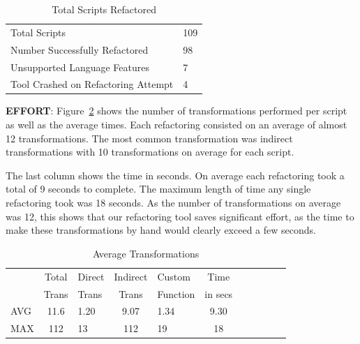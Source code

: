 \documentclass{sigplanconf}
\begin{document}
\begin{table}[htdp]
\begin{center}
\begin{tabular}{ll}
Total Scripts & 109 \\
Number Successfully Refactored & 98 \\
Unsupported Language Features & 7 \\
Tool Crashed on Refactoring Attempt & 4\\
\end{tabular}
\nocaptionrule
\caption{Total Scripts Refactored}
\label{table:totalScripts}
\end{center}
\end{table}%

\textbf{EFFORT}:  
Figure~\ref{table:avgTrans} shows the number of transformations performed per script as well as the average times.
Each refactoring consisted on an average of almost 12 transformations.  The most common transformation was indirect transformations with 10  transformations on average for each script.

The last column shows the time in seconds.  On average each refactoring took a total of 9 seconds to complete.  The maximum length of time any single refactoring took was 18 seconds.  As the number of transformations on average was 12, this shows that our refactoring tool saves significant effort, as the time to make these transformations by hand would clearly exceed a few seconds.  
\begin{table}[htdp]
\begin{center}
\begin{tabular}{lclclclclcl}
 & Total & Direct & Indirect & Custom & Time \\
  & Trans & Trans & Trans & Function & in secs \\
  \hline
  \hline
AVG & 11.6 & 1.20 & 9.07 & 1.34 & 9.30 \\
\hline
MAX & 112 & 13 & 112 & 19 & 18 \\
\hline
\end{tabular}
\nocaptionrule
\caption{Average Transformations}
\end{center}
\label{table:avgTrans}
\end{table}%
\end{document}
